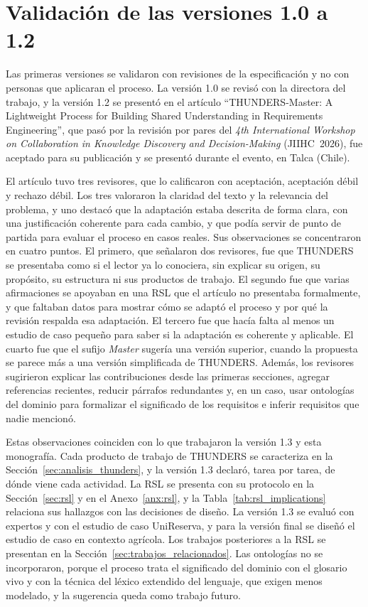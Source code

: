 \documentclass[12pt,letterpaper,oneside]{report}
\begin{document}
\section{Validación de las versiones 1.0 a 1.2}
\label{sec:val_v12}
Las primeras versiones se validaron con revisiones de la especificación y no con
personas que aplicaran el proceso. La versión 1.0 se revisó con la directora del
trabajo, y la versión 1.2 se presentó en el artículo
``THUNDERS-Master: A Lightweight Process for Building Shared Understanding in
Requirements Engineering'', que pasó por la revisión por pares del
\textit{4th International Workshop on Collaboration in Knowledge Discovery and
Decision-Making} (JIIHC~2026), fue aceptado para su publicación y se presentó
durante el evento, en Talca (Chile).

El artículo tuvo tres revisores, que lo calificaron con aceptación, aceptación
débil y rechazo débil. Los tres valoraron la claridad del texto y la relevancia
del problema, y uno destacó que la adaptación estaba descrita de forma clara, con
una justificación coherente para cada cambio, y que podía servir de punto de
partida para evaluar el proceso en casos reales. Sus observaciones se
concentraron en cuatro puntos. El primero, que señalaron dos revisores, fue que
THUNDERS se presentaba como si el lector ya lo conociera, sin explicar su
origen, su propósito, su estructura ni sus productos de trabajo. El segundo fue que
varias afirmaciones se apoyaban en una RSL que el artículo no presentaba formalmente, y que faltaban datos para mostrar cómo se adaptó el proceso y
por qué la revisión respalda esa adaptación. El tercero fue que hacía falta al
menos un estudio de caso pequeño para saber si la adaptación es coherente y
aplicable. El cuarto fue que el sufijo \textit{Master} sugería una versión
superior, cuando la propuesta se parece más a una versión simplificada de
THUNDERS. Además, los revisores sugirieron explicar las contribuciones desde las
primeras secciones, agregar referencias recientes, reducir párrafos redundantes
y, en un caso, usar ontologías del dominio para formalizar el significado de los
requisitos e inferir requisitos que nadie mencionó.

Estas observaciones coinciden con lo que trabajaron la versión 1.3 y esta
monografía. Cada producto de trabajo de THUNDERS se caracteriza en la
Sección~\ref{sec:analisis_thunders}, y la versión 1.3 declaró, tarea por tarea,
de dónde viene cada actividad. La RSL se presenta con su protocolo en la
Sección~\ref{sec:rsl} y en el Anexo~\ref{anx:rsl}, y la
Tabla~\ref{tab:rsl_implications} relaciona sus hallazgos con las decisiones de
diseño. La versión 1.3 se evaluó con expertos y con el estudio de caso
UniReserva, y para la versión final se diseñó el estudio de caso en contexto
agrícola. Los trabajos posteriores a la RSL se presentan
en la Sección~\ref{sec:trabajos_relacionados}. Las ontologías no se
incorporaron, porque el proceso trata el significado del dominio con el glosario
vivo y con la técnica del léxico extendido del lenguaje, que exigen menos
modelado, y la sugerencia queda como trabajo futuro.
\end{document}
